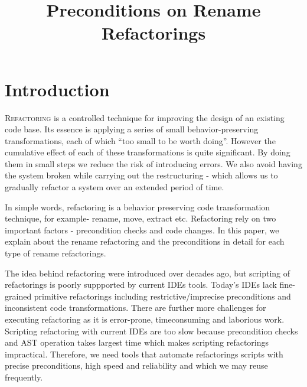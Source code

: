 \documentclass[10pt,conference]{IEEEtran}
\begin{document}
\title{Preconditions on Rename Refactorings}

\author{
\and
{}
\and
{}
}

\maketitle

\section{\textbf{Introduction}}
\lettrine{R}{efactoring} is a controlled technique for improving the design of an existing code base. Its essence is applying a series of small behavior-preserving transformations, each of which ``too small to be worth doing''. However the cumulative effect of each of these transformations is quite significant. By doing them in small steps we reduce the risk of introducing errors. We also avoid having the system broken while carrying out the restructuring - which allows us to gradually refactor a system over an extended period of time.~\cite{Fowler}

In simple words, refactoring is a behavior preserving code transformation technique, for example- rename, move, extract etc. Refactoring rely on two important factors - precondition checks and code changes. In this paper, we explain about the rename refactoring and the preconditions in detail for each type of rename refactorings. 

The idea behind refactoring were introduced over decades ago, but scripting of refactorings is poorly suppported by current IDEs tools. Today’s IDEs lack fine-grained primitive refactorings including restrictive/imprecise preconditions and inconsistent code transformations. There are further more challenges for executing refactoring as it is error-prone, timeconsuming and laborious work. Scripting refactoring with current IDEs are too slow because precondition checks and AST operation takes largest time which makes scripting refactorings impractical. Therefore, we need tools that automate refactorings scripts with precise preconditions, high speed and reliability and which we may reuse frequently. 
\end{document}
